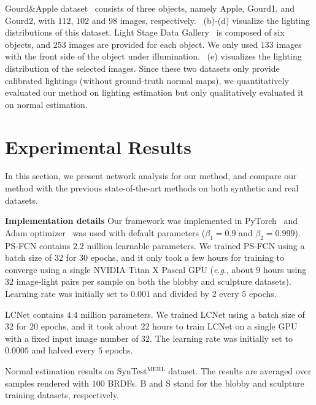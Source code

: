 \documentclass[10pt,journal,compsoc]{IEEEtran}
\newcommand{\eg}{\textit{e}.\textit{g}.}
\renewcommand{\paragraph}[1]{\vspace{0.2em}\noindent \textbf{#1 \hspace{0.2em}}}
\begin{document}
Gourd\&Apple dataset~\cite{alldrin2008p} consists of three objects, namely {\sc Apple}, {\sc Gourd1}, and {\sc Gourd2}, with $112$, $102$ and $98$ images, respectively. 
~(b)-(d) visualize the lighting distributions of this dataset.  
Light Stage Data Gallery~\cite{einarsson2006relighting} is composed of six objects, and $253$ images are provided for each object. We only used $133$ images with the front side of the object under illumination. ~(e) visualizes the lighting distribution of the selected images.
Since these two datasets only provide calibrated lightings (without ground-truth normal maps), we quantitatively evaluated our method on lighting estimation but only qualitatively evaluated it on normal estimation.

\section{Experimental Results}
\label{sec:exp}
In this section, we present network analysis for our method, and compare our method with the previous state-of-the-art methods on both synthetic and real datasets.

\paragraph{Implementation details}
Our framework was implemented in PyTorch~\cite{paszke2017pytorch} and Adam optimizer~\cite{kingma2014adam} was used with default parameters ($\beta_1=0.9$ and $\beta_2=0.999$).
PS-FCN contains $2.2$ million learnable parameters.
We trained PS-FCN using a batch size of $32$ for $30$ epochs, and it only took a few hours for training to converge using a single NVIDIA Titan X Pascal GPU (\eg, about $9$ hours using $32$ image-light pairs per sample on both the blobby and sculpture datasets). Learning rate was initially set to $0.001$ and divided by $2$ every $5$ epochs. 

LCNet contains $4.4$ million parameters. We trained LCNet using a batch size of $32$ for $20$ epochs, and it took about $22$ hours to train LCNet on a single GPU with a fixed input image number of $32$. The learning rate was initially set to $0.0005$ and halved every $5$ epochs. 

\begin{table}[t] \centering
    \caption{Normal estimation results on SynTest$^\text{MERL}$ dataset. The results are averaged over samples rendered with $100$ BRDFs. B and S stand for the blobby and sculpture training datasets, respectively.} %
     \label{tab:quant_calib_normal_syn}
\end{table}
\end{document}
